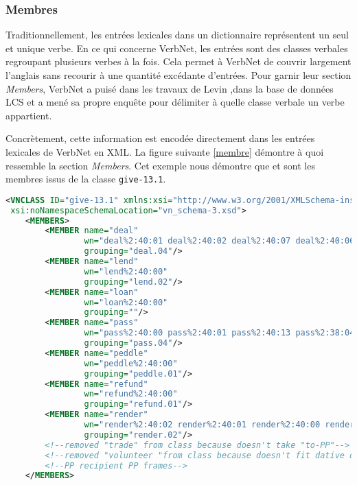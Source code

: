 \subsubsection{Membres}
Traditionnellement, les entrées lexicales dans un dictionnaire représentent un seul et unique verbe. En ce qui concerne VerbNet, les entrées sont des classes verbales regroupant  plusieurs verbes à la fois. Cela permet à VerbNet de couvrir largement l'anglais sans recourir à une quantité excédante d'entrées. Pour garnir leur section \emph{Members}, VerbNet a puisé dans les travaux de Levin \cite{verb-classes.levin.1993},dans la base de données LCS \citep{AyanGeneratingParsingLexicon2002a} et a mené sa propre enquête pour délimiter à quelle classe verbale un verbe appartient.

Concrètement, cette information est encodée directement dans les entrées lexicales de VerbNet en XML. La figure suivante \ref{membre} démontre à quoi ressemble la section \emph{Members}. Cet exemple nous démontre que  et  sont les membres issus de la classe \texttt{give-13.1}.

\begin{lstlisting}[language=XML, caption = Les membres d'une classe, label=membre]
<VNCLASS ID="give-13.1" xmlns:xsi="http://www.w3.org/2001/XMLSchema-instance"
 xsi:noNamespaceSchemaLocation="vn_schema-3.xsd">
    <MEMBERS>
        <MEMBER name="deal" 
				wn="deal%2:40:01 deal%2:40:02 deal%2:40:07 deal%2:40:06" 
				grouping="deal.04"/>
        <MEMBER name="lend" 
				wn="lend%2:40:00" 
				grouping="lend.02"/>
        <MEMBER name="loan" 
				wn="loan%2:40:00" 
				grouping=""/>
        <MEMBER name="pass" 
				wn="pass%2:40:00 pass%2:40:01 pass%2:40:13 pass%2:38:04" 
				grouping="pass.04"/>
        <MEMBER name="peddle" 
				wn="peddle%2:40:00" 
				grouping="peddle.01"/>
        <MEMBER name="refund" 
				wn="refund%2:40:00" 
				grouping="refund.01"/>
        <MEMBER name="render" 
				wn="render%2:40:02 render%2:40:01 render%2:40:00 render%2:40:03" 
				grouping="render.02"/>
        <!--removed "trade" from class because doesn't take "to-PP"-->
        <!--removed "volunteer "from class because doesn't fit dative or-->
        <!--PP recipient PP frames-->
    </MEMBERS>
\end{lstlisting}


